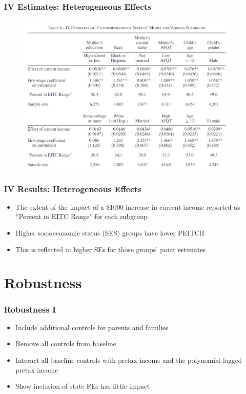 \documentclass{beamer}
\begin{document}
\begin{frame}
\frametitle{IV Estimates: Heterogeneous Effects}
\begin{figure}
	\includegraphics[scale=0.34]{../Tables/table5.png} %
\end{figure}
\end{frame}

\begin{frame}
\frametitle{IV Results: Heterogeneous Effects}
\begin{itemize}
	\item The extent of the impact of a \$1000 increase in current income reported as ``Percent in EITC Range" for each subgroup
	\item Higher socioeconomic status (SES) groups have lower PEITCR
	\item This is reflected in higher SEs for those groups' point estimates
\end{itemize}
\end{frame}


\section{Robustness}


\begin{frame}
\frametitle{Robustness I}
\begin{itemize}
	\item Include additional controls for parents and families
	\item Remove all controls from baseline
	\item Interact all baseline controls with pretax income and the polynomial lagged pretax income
	\item Show inclusion of state FEs has little impact
\end{itemize}
\end{frame}
\end{document}
